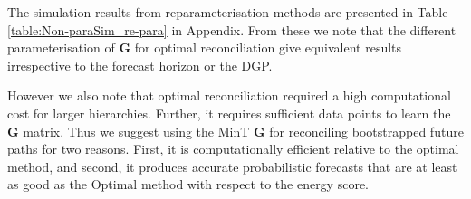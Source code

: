 \documentclass[12pt]{article}
\theoremstyle{definition}
\begin{document}
The simulation results from reparameterisation methods are presented in Table \ref{table:Non-paraSim_re-para} in Appendix. From these we note that the different parameterisation of $\bm{G}$ for optimal reconciliation give equivalent results irrespective to the forecast horizon or the DGP.

However we also note that optimal reconciliation required a high computational cost for larger hierarchies. Further, it requires sufficient data points to learn the $\bm{G}$ matrix. Thus we suggest using the MinT $\bm{G}$ for reconciling bootstrapped future paths for two reasons. First, it is computationally efficient relative to the optimal method, and second, it produces accurate probabilistic forecasts that are at least as good as the Optimal method with respect to the energy score.

\begin{table}
	\caption{Energy scores (ES) and variogram scores (VS) for probabilistic forecasts from different reconciliation methods are presented. Bottom row represent the scores for base forecasts which are not coherent. The smaller the scores, the better the forecasts are.} \label{table:Non-paraSimulation}
	\begin{center}
		\tabcolsep=0.08cm\small
\end{center}
\end{table}
\end{document}
